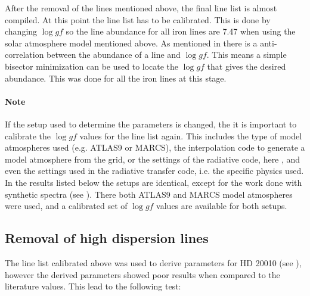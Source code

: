After the removal of the lines mentioned above, the final line list is almost compiled. At this
point the line list has to be calibrated. This is done by changing $\log \mathit{gf}$ so the line
abundance for all iron lines are 7.47 when using the solar atmosphere model mentioned above. As
mentioned in  there is a anti-correlation between the abundance of a line and
$\log \mathit{gf}$. This means a simple bisector minimization can be used to locate the
$\log\mathit{gf}$ that gives the desired abundance. This was done for all the iron lines at this
stage.

\paragraph{Note}
If the setup used to determine the parameters is changed, the it is important to calibrate the $\log
\mathit{gf}$ values for the line list again. This includes the type of model atmospheres used (e.g.
ATLAS9 or MARCS), the interpolation code to generate a model atmosphere from the grid, or the
settings of the radiative code, here , and even the settings used in the radiative
transfer code, i.e. the specific physics used. In the results listed below the setups are identical,
except for the work done with synthetic spectra (see ). There both
ATLAS9 and MARCS model atmospheres were used, and a calibrated set of $\log \mathit{gf}$ values are
available for both setups.


\subsection{Removal of high dispersion lines}

The line list calibrated above was used to derive parameters for HD 20010 (see ),
however the derived parameters showed poor results when compared to the literature values. This lead
to the following test:

